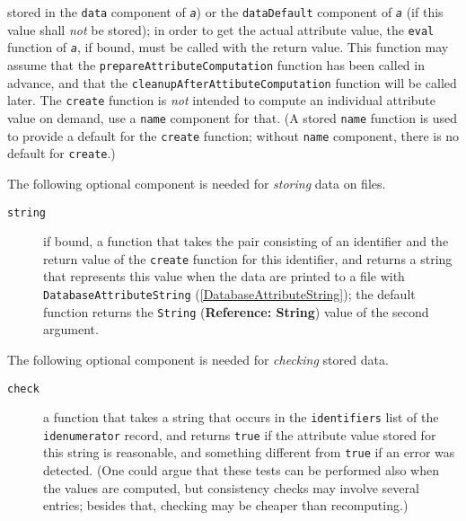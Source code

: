 \documentclass[a4paper,11pt]{report}
\begin{document}
{{{\begin{description}
stored in the \texttt{data} component of \mbox{\texttt{\mdseries\slshape a}}) or the \texttt{dataDefault} component of \mbox{\texttt{\mdseries\slshape a}} (if this value shall \emph{not} be stored); in order to get the actual attribute value, the \texttt{eval} function of \mbox{\texttt{\mdseries\slshape a}}, if bound, must be called with the return value. This function may assume
that the \texttt{prepareAttributeComputation} function has been called in advance, and that the \texttt{cleanupAfterAttibuteComputation} function will be called later. The \texttt{create} function is \emph{not} intended to compute an individual attribute value on demand, use a \texttt{name} component for that. (A stored \texttt{name} function is used to provide a default for the \texttt{create} function; without \texttt{name} component, there is no default for \texttt{create}.) 
\end{description}
 

 The following optional component is needed for \emph{storing} data on files. 

 

 
\begin{description}
\item[{\texttt{string}}]  if bound, a function that takes the pair consisting of an identifier and the
return value of the \texttt{create} function for this identifier, and returns a string that represents this value
when the data are printed to a file with \texttt{DatabaseAttributeString} (\ref{DatabaseAttributeString}); the default function returns the \texttt{String} (\textbf{Reference: String}) value of the second argument. 
\end{description}
 

 The following optional component is needed for \emph{checking} stored data. 

 
\begin{description}
\item[{\texttt{check}}]  a function that takes a string that occurs in the \texttt{identifiers} list of the \texttt{idenumerator} record, and returns \texttt{true} if the attribute value stored for this string is reasonable, and something
different from \texttt{true} if an error was detected. (One could argue that these tests can be performed
also when the values are computed, but consistency checks may involve several
entries; besides that, checking may be cheaper than recomputing.) 
\end{description}
 }

 
}}
\end{document}
